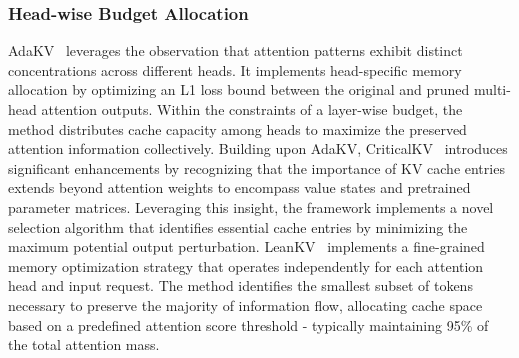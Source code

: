 \subsubsection{Head-wise Budget Allocation}\label{sssec:kv_budget_head_wise}
AdaKV~\cite{DBLP:journals/corr/abs-2407-11550} leverages the observation that attention patterns exhibit 
distinct concentrations across different heads. It implements head-specific memory allocation by 
optimizing an L1 loss bound between the original and pruned multi-head attention outputs. 
Within the constraints of a layer-wise budget, the method distributes cache capacity among heads to 
maximize the preserved attention information collectively.
Building upon AdaKV, CriticalKV~\cite{anonymous2024identify} introduces significant enhancements by recognizing that 
the importance of KV cache entries extends beyond attention weights to encompass value states and 
pretrained parameter matrices. Leveraging this insight, the framework implements a novel selection 
algorithm that identifies essential cache entries by minimizing the maximum potential output perturbation.
LeanKV~\cite{zhang2024unifyingkvcachecompression} implements a fine-grained memory optimization strategy that operates independently 
for each attention head and input request. The method identifies the smallest subset of tokens 
necessary to preserve the majority of information flow, allocating cache space based on a 
predefined attention score threshold - typically maintaining 95\% of the total attention mass.




